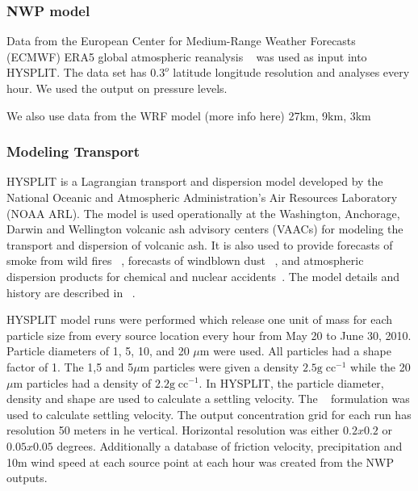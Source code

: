 \subsubsection{NWP model}
Data from the European Center for Medium-Range Weather Forecasts (ECMWF) ERA5 global atmospheric reanalysis ~\citep{era5} was used
as input into HYSPLIT.
The data set has $0.3^o$ latitude longitude resolution and analyses every hour. We used the output on pressure levels.

We also use data from the WRF model (more info here) 27km, 9km, 3km

\subsubsection{Modeling Transport}
HYSPLIT is a Lagrangian transport and dispersion model developed by the National Oceanic and Atmospheric Administration's Air Resources Laboratory (NOAA ARL).  
The model is used operationally at the  Washington, Anchorage, Darwin and Wellington volcanic ash advisory centers (VAACs) for modeling the transport and dispersion of volcanic ash{\color{blue}.} 
It is also used to provide 
forecasts of smoke from wild fires ~\citep{Rolph09, Stein09}, forecasts of windblown dust ~\citep{Draxler10}, and atmospheric dispersion products for chemical and nuclear accidents~\citep{Draxler12}. The model details and history are described in 
~\cite{Draxler97, Draxler98, bams}. 

HYSPLIT model runs were performed which release one unit of mass for each particle size from every source location every hour from May 20 to June 30, 2010.
Particle diameters of 1, 5, 10, and 20 $\mu\mathrm{m}$ were used. All particles had a shape factor of 1.
The 1,5 and 5$\mu\mathrm{m}$ particles were given a density $2.5\mathrm{g}\;\mathrm{cc}^{-1}$ while the 20$\mu\mathrm{m}$ particles had a density of 
$2.2\mathrm{g}\;\mathrm{cc}^{-1}$. In HYSPLIT, the particle diameter, density and shape are used
to calculate a settling velocity. The ~\cite{Ganser93, dare} formulation was used to calculate settling velocity.
The output concentration grid for each run has resolution 50 meters in he vertical. Horizontal resolution was either $0.2x0.2$ or $0.05x0.05$ degrees.
Additionally a database of friction velocity, precipitation  and 10m wind speed at each source point at each hour was created from the NWP outputs.

